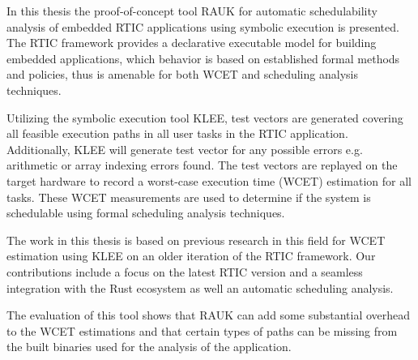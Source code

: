 In this thesis the proof-of-concept tool RAUK for automatic schedulability
analysis of embedded RTIC applications using symbolic execution is presented.
The RTIC framework provides a declarative executable model for building
embedded applications, which behavior is based on established formal methods
and policies, thus is amenable for both WCET and scheduling analysis techniques.

Utilizing the symbolic execution tool KLEE, test vectors are generated covering all
feasible execution paths in all user tasks in the RTIC application.
Additionally, KLEE will generate test vector for any possible errors e.g.
arithmetic or array indexing errors found. The test vectors are replayed on the
target hardware to record a worst-case execution time (WCET) estimation for all
tasks. These WCET measurements are used to determine if the system is
schedulable using formal scheduling analysis techniques.

The work in this thesis is based on previous research in this field for WCET
estimation using KLEE on an older iteration of the RTIC framework. Our
contributions include a focus on the latest RTIC version and a seamless
integration with the Rust ecosystem as well an automatic scheduling analysis.

The evaluation of this tool shows that RAUK can add some substantial overhead
to the WCET estimations and that certain types of paths can be missing from the
built binaries used for the analysis of the application.
